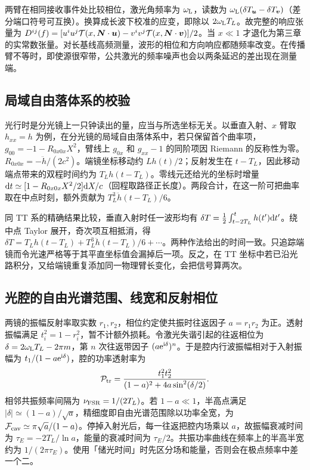 两臂在相同接收事件处比较相位，激光角频率为 $\omega_{\rm L}$，读数为 $\omega_{\rm L}(\delta T_{\bm u}-\delta T_{\bm v})$（差分端口符号可互换）。换算成长波下校准的应变，即除以 $2\omega_{\rm L}T_L$。故完整的响应张量为 $D^{ij}(f)=[u^iu^j{\cal T}(x,\bm N\cdot\bm u)-v^iv^j{\cal T}(x,\bm N\cdot\bm v)]/2$。当 $x\ll1$ 才退化为第三章的实常数张量。对长基线高频测量，波形的相位和方向响应都随频率改变。在传播臂不等时，即使源很窄带，公共激光的频率噪声也会以两条延迟的差出现在测量端。

\subsection{局域自由落体系的校验}
光行时是分光镜上一只钟读出的量，应当与所选坐标无关。以垂直入射、$x$ 臂取 $h_{xx}=h$ 为例，在分光镜的局域自由落体系中，若只保留首个曲率项，$g_{00}=-1-R_{0x0x}X^2$，臂线上 $g_{0x}$ 和 $g_{xx}-1$ 的同阶项因 Riemann 的反称性为零。$R_{0x0x}=-\ddot h/(2c^2)$。端镜坐标移动约 $Lh(t)/2$；反射发生在 $t-T_L$，因此移动端点带来的双程时间约为 $T_L h(t-T_L)$。零线元还给光的坐标时增量 $\dd t\simeq[1-R_{0x0x}X^2/2]\dd X/c$（回程取路径正长度）。两段合计，在这一阶可把曲率取在中点时刻，额外贡献为 $T_L^3\ddot h(t-T_L)/6$。

同 TT 系的精确结果比较，垂直入射时任一波形均有 $\delta T=\frac12\int_{t-2T_L}^{t}h(t')\dd t'$。绕中点 Taylor 展开，奇次项互相抵消，得 $\delta T=T_L h(t-T_L)+T_L^3\ddot h(t-T_L)/6+\cdots$。两种作法给出的时间一致。只追踪端镜而令光速严格等于其平直坐标值会漏掉后一项。反之，在 TT 坐标中若已沿光路积分，又给端镜重复添加同一物理臂长变化，会把信号算两次。

\subsection{光腔的自由光谱范围、线宽和反射相位}
两镜的振幅反射率取实数 $r_1,r_2$，相位约定使共振时往返因子 $a=r_1r_2$ 为正。透射振幅满足 $t_i^2=1-r_i^2$，暂不计额外损耗。令激光失谐引起的往返相位为 $\delta=2\omega_{\rm L}T_L-2\pi m$，第 $n$ 次往返带因子 $(a\mathrm{e}^{\mathrm{i}\delta})^n$。于是腔内行波振幅相对于入射振幅为 $t_1/(1-a\mathrm{e}^{\mathrm{i}\delta})$，腔的功率透射率为
\[
 {\cal P}_{\rm tr}=\frac{t_1^2t_2^2}{(1-a)^2+4a\sin^2(\delta/2)} .
\]
相邻共振频率间隔为 $\nu_{\rm FSR}=1/(2T_L)$。若 $1-a\ll1$，半高点满足 $|\delta|\simeq(1-a)/\sqrt a$，精细度即自由光谱范围除以功率全宽，为 $\mathcal F_{\rm cav}\simeq\pi\sqrt a/(1-a)$。停掉入射光后，每一往返把腔内场乘以 $a$，故振幅衰减时间为 $\tau_E=-2T_L/\ln a$，能量的衰减时间为 $\tau_E/2$。共振功率曲线在频率上的半高半宽约为 $1/(2\pi\tau_E)$。使用「储光时间」时先区分场和能量，否则会在极点频率中差一个二。

